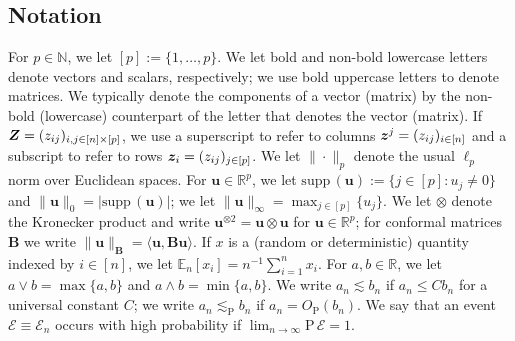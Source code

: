 \documentclass{uwstat572}
\theoremstyle{definition}
\theoremstyle{remark}
\newcommand{\R}{\ensuremath{\mathbb{R}}}
\newcommand{\N}{\mathbb{N}}
\newcommand{\gb}{\beta}
\newcommand{\gs}{\sigma}
\newcommand{\supp}{\mathrm{supp} \,}
\newcommand{\Prb}{\mathrm{P}}
\newcommand{\E}{\mathrm{E}}
\newcommand{\En}{\mathbb{E}_n}
\newcommand{\Ex}{\mathbb{E}}
\newcommand{\Exn}{\Ex_n}
\newcommand{\bs}[1]{\boldsymbol{#1}}
\numberwithin{equation}{section}
\begin{document}
\subsection{Notation}
\renewcommand{\d}{\bs{d}}
\newcommand{\dhat}{\hat{\d}}
\renewcommand{\dh}{\hat{\d}}
\newcommand{\dhatc}{\hat{d}}
\newcommand{\dhati}{\dhatc_i}
\newcommand{\db}{\d_{\regb}}
\renewcommand{\u}{\bs{u}}
\newcommand{\x}{\bs{x}}
\newcommand{\y}{\bs{y}}
\newcommand{\U}{\bs{U}}
\newcommand{\inn}{\in[n]}
\newcommand{\event}{\mathcal{E}}
\newcommand{\kp}{\otimes}
\newcommand{\kpt}{\kp2}
\newcommand{\B}{\bs{B}}
\newcommand{\ip}[1]{\langle#1\rangle}
\newcommand{\ipp}[2]{#2\langle#1 #2\rangle}

For $p\in\N$, we let $[p] := \{1,\ldots,p\}$. We let bold and non-bold lowercase letters denote vectors and scalars, respectively; we use bold uppercase letters to denote matrices. We typically denote the components of a vector (matrix) by the non-bold (lowercase) counterpart of the letter that denotes the vector (matrix). If $\Z = (z_{ij})_{i,j\in[n]\times[p]}$, we use a superscript to refer to columns $\z^j = (z_{ij})_{i\inn}$ and a subscript to refer to rows $\z_i = (z_{ij})_{j\in[p]}$. We let $\|\cdot\|_p$ denote the usual $\ell_p$ norm over Euclidean spaces.  For $\u \in \R^p$, we let $\supp(\u) := \{j\in[p]: u_j \neq 0\}$ and $\|\u\|_0 = |\supp(\u)|$; we let $\|\u\|_\infty = \max_{j\in[p]} \{u_j\}$. We let $\otimes$ denote the Kronecker product and write $\u^{\kpt} = \u \kp \u$ for $\u\in\R^p$; for conformal matrices $\B$ we write $\|\u\|_{\B} = \ip{\u,\B\u}$. If $x$ is a (random or deterministic) quantity indexed by $i\inn$, we let $\Exn[x_i] = n^{-1}\sum_{i=1}^n x_i$. For $a,b\in\R$, we let $a\vee b = \max\{a,b\}$ and $a\wedge b = \min\{a,b\}$. We write $a_n \lesssim b_n$ if $a_n \leq Cb_n$ for a universal constant $C$; we write $a_n \lesssim_\Prb b_n$ if $a_n = O_\Prb(b_n)$. We say that an event $\event \equiv \event_n$ occurs with high probability if $\lim_{n\to\infty} \Prb \, \event = 1$. 


%
\newcommand{\px}{p_{\x}}
\newcommand{\pu}{p_{\u}}
\newcommand{\pun}{p_{\u,n}}
\newcommand{\regb}{\bs{\gb}}
\newcommand{\regbh}{\hat{\regb}}
\newcommand{\fb}{f_{\regb}}
\newcommand{\fbn}{f_{\regb, n}}
\newcommand{\fbhat}{\hat{\fb}}
\newcommand{\rem}{\bs{r}}
\newcommand{\remc}{r}
\newcommand{\remi}{\remc_i}
\newcommand{\rfb}{r_{\famb}}
\newcommand{\rc}{c_r}
\newcommand{\rb}{r_{\regb}}
\newcommand{\rbn}{r_{\regb,n}}
\newcommand{\rfs}{r_{\fams}}
\newcommand{\Xs}{\mathcal{X}}
\newcommand{\Zs}{\mathcal{Z}}
\newcommand{\Fs}{\mathcal{F}}
\newcommand{\Bs}{\mathcal{B}}
\newcommand{\famb}{\Fs_\Bs}
\newcommand{\fams}{\Fs_\sb}
\newcommand{\Sb}{S}
\newcommand{\Us}{\mathcal{U}}
\renewcommand{\sb}{s}
\newcommand{\gramhat}{\hat{\bs{\Sigma}}}
\newcommand{\tune}{\lambda}
\newcommand{\esi}{u_i}
\newcommand{\sd}{\gs}
\newcommand{\f}{\bs{f}}
\newcommand{\fhat}{\hat{\f}}
\newcommand{\fhc}{\hat{f}}
\newcommand{\ffb}{\bs{f}_{\regb}}
\end{document}
